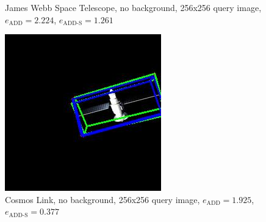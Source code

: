 \begin{figure}[h]
\begin{minipage}{0.45\linewidth}
        \caption{James Webb Space Telescope, no background, 256x256 query image, $e_\mathrm{ADD}=2.224$, $e_{\mathrm{ADD}\text{-}\mathrm{S}}=1.261$ }
        \label{fig:fig8}
    \end{minipage}
\end{figure}

\begin{figure}[h]
    \centering
    \begin{minipage}{0.45\linewidth}
        \centering
        \includegraphics[width=\linewidth]{data/fig9.jpg} %
        \caption{Cosmos Link, no background, 256x256 query image, $e_\mathrm{ADD}=1.925$, $e_{\mathrm{ADD}\text{-}\mathrm{S}}=0.377$ }
        \label{fig:fig9}
    \end{minipage}\hfill
    \begin{minipage}{0.45\linewidth}
        \centering

\end{minipage}
\end{figure}
